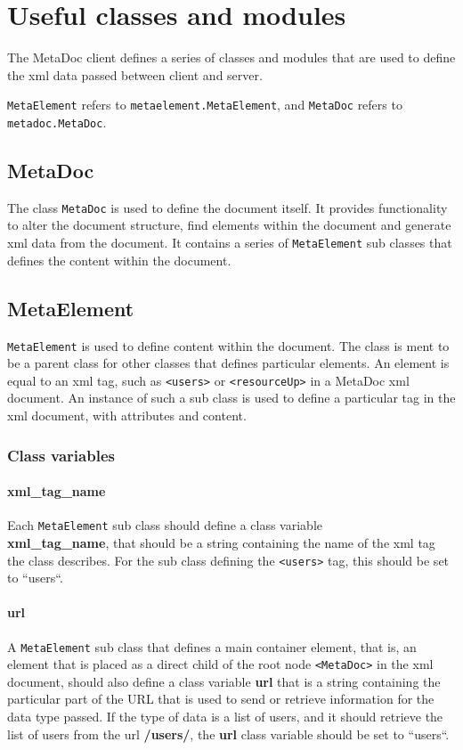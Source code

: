 \newpage
\section{Useful classes and modules}
\label{sec:useful_classes}
The MetaDoc client defines a series of classes and modules that are used to
define the \gls{xml} data passed between client and server. 

\texttt{MetaElement} refers to \texttt{metaelement.MetaElement}, and
\texttt{MetaDoc} refers to \\ \texttt{metadoc.MetaDoc}.

\subsection{MetaDoc}
The class \texttt{MetaDoc} is used to define the document itself. It provides
functionality to alter the document structure, find elements within the
document and generate \gls{xml} data from the document. It contains a series of
\texttt{MetaElement} sub classes that defines the content within the document.

\subsection{MetaElement}
\texttt{MetaElement} is used to define content within the document.  The class
is ment to be a parent class for other classes that defines particular
elements. An element is equal to an \gls{xml} tag, such as \texttt{<users>} or
\texttt{<resourceUp>} in a MetaDoc \gls{xml} document. An instance of such a
sub class is used to define a particular tag in the \gls{xml} document, with
attributes and content.  

\subsubsection{Class variables}

\paragraph{xml\_tag\_name}
Each \texttt{MetaElement} sub class should define a class variable \\
\textbf{xml\_tag\_name}, that should be a string containing the name of the
\gls{xml} tag the class describes. For the sub class defining the
\texttt{<users>} tag, this should be set to ``users``. 

\paragraph{url}
A \texttt{MetaElement} sub class that defines a main container element, that
is, an element that is placed as a direct child of the root node
\texttt{<MetaDoc>} in the \gls{xml} document, should also define a class
variable \textbf{url} that is a string containing the particular part of the
URL that is used to send or retrieve information for the data type passed. If
the type of data is a list of users, and it should retrieve the list of users
from the url \textbf{/users/}, the \textbf{url} class variable should be set to
``users``.

